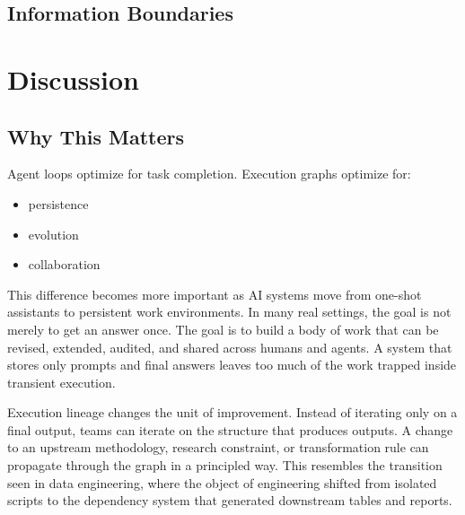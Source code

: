 \documentclass{article}
\begin{document}
\subsection{Information Boundaries}

\begin{table}[h]
\centering
\scriptsize
{}
\caption{Information boundaries by condition. The comparison is system-level, not an equal-prompt comparison.}
\label{tab:info-boundaries}
\end{table}

\section{Discussion}

\subsection{Why This Matters}

Agent loops optimize for task completion. Execution graphs optimize for:
\begin{itemize}
\item persistence
\item evolution
\item collaboration
\end{itemize}

This difference becomes more important as AI systems move from one-shot assistants to persistent work environments. In many real settings, the goal is not merely to get an answer once. The goal is to build a body of work that can be revised, extended, audited, and shared across humans and agents. A system that stores only prompts and final answers leaves too much of the work trapped inside transient execution.

Execution lineage changes the unit of improvement. Instead of iterating only on a final output, teams can iterate on the structure that produces outputs. A change to an upstream methodology, research constraint, or transformation rule can propagate through the graph in a principled way. This resembles the transition seen in data engineering, where the object of engineering shifted from isolated scripts to the dependency system that generated downstream tables and reports.
\end{document}
